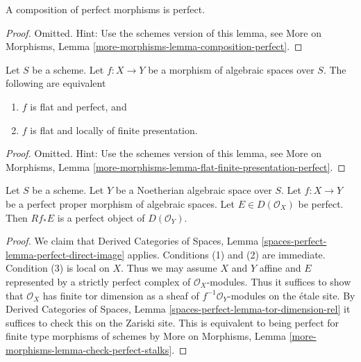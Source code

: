 \begin{lemma}
\label{lemma-composition-perfect}
A composition of perfect morphisms is perfect.
\end{lemma}

\begin{proof}
Omitted. Hint: Use the schemes version of this lemma, see
More on Morphisms,
Lemma \ref{more-morphisms-lemma-composition-perfect}.
\end{proof}

\begin{lemma}
\label{lemma-flat-finite-presentation-perfect}
Let $S$ be a scheme. Let $f : X \to Y$ be a morphism of algebraic spaces over
$S$. The following are equivalent
\begin{enumerate}
\item $f$ is flat and perfect, and
\item $f$ is flat and locally of finite presentation.
\end{enumerate}
\end{lemma}

\begin{proof}
Omitted. Hint: Use the schemes version of this lemma, see
More on Morphisms,
Lemma \ref{more-morphisms-lemma-flat-finite-presentation-perfect}.
\end{proof}

\begin{lemma}
\label{lemma-perfect-proper-perfect-direct-image}
Let $S$ be a scheme. Let $Y$ be a Noetherian algebraic space over $S$.
Let $f : X \to Y$ be a perfect proper morphism of algebraic spaces.
Let $E \in D(\mathcal{O}_X)$ be perfect. Then
$Rf_*E$ is a perfect object of $D(\mathcal{O}_Y)$.
\end{lemma}

\begin{proof}
We claim that Derived Categories of Spaces, Lemma
\ref{spaces-perfect-lemma-perfect-direct-image} applies.
Conditions (1) and (2) are immediate. Condition (3) is local
on $X$. Thus we may assume $X$ and $Y$ affine and $E$
represented by a strictly perfect complex of $\mathcal{O}_X$-modules.
Thus it suffices to show that $\mathcal{O}_X$ has finite
tor dimension as a sheaf of $f^{-1}\mathcal{O}_Y$-modules
on the \'etale site. By Derived Categories of Spaces, Lemma
\ref{spaces-perfect-lemma-tor-dimension-rel} it suffices to
check this on the Zariski site. This is equivalent to being perfect
for finite type morphisms of schemes by More on Morphisms,
Lemma \ref{more-morphisms-lemma-check-perfect-stalks}.
\end{proof}











